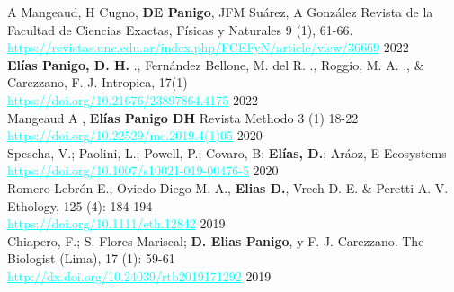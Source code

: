 \documentclass[
	a4paper,
]{fortysecondscv}
\begin{document}
\begin{cvtable}
		{A Mangeaud, H Cugno,  \textbf{DE Panigo}, JFM Suárez, A González}
		{ Revista de la Facultad de Ciencias Exactas, Físicas y Naturales 9 (1), 61-66.\\
		\textcolor{cyan}{\underline{https://revistas.unc.edu.ar/index.php/FCEFyN/article/view/36669}}}
		{2022}
	\\

		{\textbf{Elías Panigo, D. H.} ., Fernández Bellone, M. del R. ., Roggio, M. A. ., \& Carezzano, F. J.}
		{Intropica, 17(1)\\
		\textcolor{cyan}{\underline{https://doi.org/10.21676/23897864.4175}}}
		{2022}
	\\

		{Mangeaud A , \textbf{Elías Panigo DH}}
		{Revista Methodo 3 (1) 18-22\\
		\textcolor{cyan}{\underline{https://doi.org/10.22529/me.2019.4(1)05}}}
		{2020}
	\\
	
		{Spescha, V.; Paolini, L.; Powell, P.; Covaro, B; \textbf{Elías, D.}; Aráoz, E}
		{Ecosystems\\
		\textcolor{cyan}{\underline{https://doi.org/10.1007/s10021-019-00476-5}}}
		{2020}
	\\

		{Romero Lebrón E., Oviedo Diego M. A., \textbf{Elias D.}, Vrech D. E. \& Peretti A. V.}
		{Ethology, 125 (4): 184-194\\
		\textcolor{cyan}{\underline{https://doi.org/10.1111/eth.12842}}}
		{2019}
	\\
	
	{Chiapero, F.; S. Flores Mariscal;  \textbf{D. Elias Panigo}, y F. J. Carezzano.}
	{The Biologist (Lima), 17 (1): 59-61\\
		\textcolor{cyan}{\underline{http://dx.doi.org/10.24039/rtb2019171292}}}
	{2019}
	\\
	

\end{cvtable}
\end{document}
